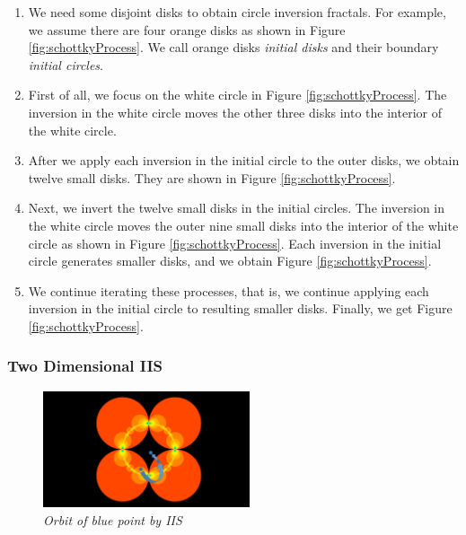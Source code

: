 \begin{enumerate}
 \item We need some disjoint disks to obtain circle inversion fractals.
       For example, we assume there are four orange disks as shown in
       Figure \ref{fig:schottkyProcess}. We call orange disks \textit{initial
       disks} and their boundary \textit{initial circles}.
 \item First of all, we focus on the white circle in Figure
       \ref{fig:schottkyProcess}. The inversion in the white circle moves the
       other three disks into the interior of the white circle.
 \item After we apply each inversion in the initial circle to the outer disks,
       we obtain twelve small disks. They are shown in Figure \ref{fig:schottkyProcess}.
 \item Next, we invert the twelve small disks in the initial circles.
       The inversion in the white circle moves the outer nine small disks
       into the interior of the white circle as shown in Figure \ref{fig:schottkyProcess}.
       Each inversion in the initial circle generates smaller disks, and we
       obtain Figure \ref{fig:schottkyProcess}.
 \item We continue iterating these processes, that is, we continue
       applying each inversion in the initial circle to resulting
       smaller disks.
       Finally, we get Figure \ref{fig:schottkyProcess}.
\end{enumerate}

\subsubsection{Two Dimensional IIS}

\begin{figure}[htbp]
  \center
  \includegraphics[height=1.35in, keepaspectratio]{img/preparation/orbIIS.png}
  \caption{\textit{Orbit of blue point by IIS}}
  \label{fig:iisOrbit}
 \hspace*{\fill}
\end{figure}

